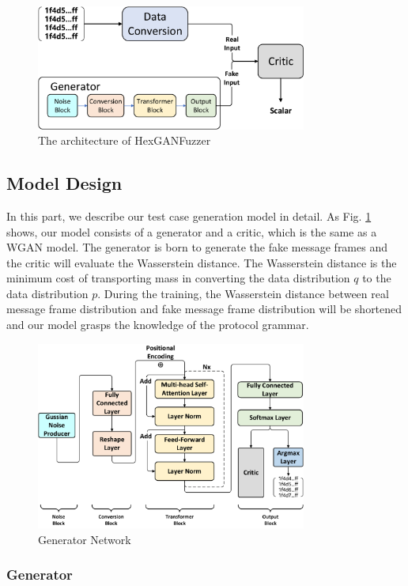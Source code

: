 \begin{figure}[htbp]   %
	\centering 
	\includegraphics[width=3.5in]{FigHexGANFuzzer_model.pdf}
	\caption{The architecture of HexGANFuzzer}
	\label{FigHexGANFuzzer_model}
\end{figure}
\subsection{Model Design} 
\label{sec:model_design} 
In this part, we describe our test case generation model in detail. As Fig. \ref{FigHexGANFuzzer_model} shows, our model consists of a generator and a critic, which is the same as a WGAN model. The generator is born to generate the fake message frames and the critic will evaluate the Wasserstein distance. The Wasserstein distance is the minimum cost of transporting mass in converting the data distribution $q$ to the data distribution $p$. During the training, the Wasserstein distance between real message frame distribution and fake message frame distribution will be shortened and our model grasps the knowledge of the protocol grammar.

\begin{figure}[htbp]   %
	\centering 
	\includegraphics[width=3.5in]{FigHexGANFuzzer_Generator.pdf}
	\caption{Generator Network}
	\label{FigHexGANFuzzer_Generator}
\end{figure}
\subsubsection{\textbf{Generator}}

